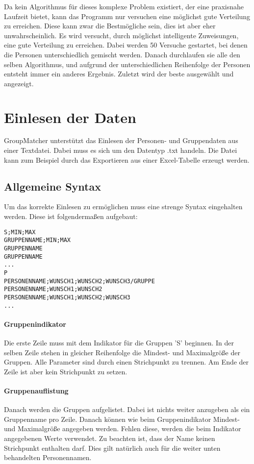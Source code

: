 \documentclass[a4paper,11pt]{article}
\begin{document}
Da kein Algorithmus für dieses komplexe Problem existiert, der eine praxisnahe Laufzeit bietet, kann das Programm nur versuchen eine möglichst gute Verteilung zu erreichen. Diese kann zwar die Bestmögliche sein, dies ist aber eher unwahrscheinlich. Es wird versucht, durch möglichst intelligente Zuweisungen, eine gute Verteilung zu erreichen. Dabei werden 50 Versuche gestartet, bei denen die Personen unterschiedlich gemischt werden. Danach durchlaufen sie alle den selben Algorithmus, und aufgrund der unterschiedlichen Reihenfolge der Personen entsteht immer ein anderes Ergebnis. Zuletzt wird der beste ausgewählt und angezeigt.

\section{Einlesen der Daten}
\label{sec:input-from-file}
GroupMatcher unterstützt das Einlesen der Personen- und Gruppendaten aus einer Textdatei. Dabei muss es sich um den Datentyp .txt handeln. Die Datei kann zum Beispiel durch das Exportieren aus einer Excel-Tabelle erzeugt werden.
\subsection{Allgemeine Syntax}
\label{ssec:input-syntax}
Um das korrekte Einlesen zu ermöglichen muss eine strenge Syntax eingehalten werden. Diese ist folgendermaßen aufgebaut:
\begin{lstlisting}
S;MIN;MAX
GRUPPENNAME;MIN;MAX
GRUPPENNAME
GRUPPENNAME
...
P
PERSONENNAME;WUNSCH1;WUNSCH2;WUNSCH3/GRUPPE
PERSONENNAME;WUNSCH1;WUNSCH2
PERSONENNAME;WUNSCH1;WUNSCH2;WUNSCH3
...
\end{lstlisting}
\paragraph{Gruppenindikator}
Die erste Zeile muss mit dem Indikator für die Gruppen 'S' beginnen.  In der selben Zeile stehen in gleicher Reihenfolge die Mindest- und Maximalgröße der Gruppen. Alle Parameter sind durch einen Strichpunkt zu trennen. Am Ende der Zeile ist aber kein Strichpunkt zu setzen.
\paragraph{Gruppenauflistung}
Danach werden die Gruppen aufgelistet. Dabei ist nichts weiter anzugeben als ein Gruppenname pro Zeile. Danach können wie beim Gruppenindikator Mindest- und Maximalgröße angegeben werden. Fehlen diese, werden die beim Indikator angegebenen Werte verwendet. Zu beachten ist, dass der Name keinen Strichpunkt enthalten darf. Dies gilt natürlich auch für die weiter unten behandelten Personennamen.
\end{document}
